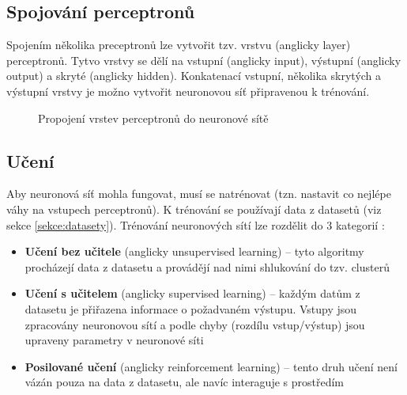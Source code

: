 \subsection*{Spojování perceptronů}
Spojením několika preceptronů lze vytvořit tzv. vrstvu (anglicky layer) perceptronů. Tytvo vrstvy se dělí na vstupní (anglicky input), výstupní (anglicky output) a skryté (anglicky hidden). Konkatenací vstupní, několika skrytých a výstupní vrstvy je možno vytvořit neuronovou síť připravenou k trénování.

\begin{figure}[H]
  \begin{center}
  \label{obrazek:nsexample}
  \caption{Propojení vrstev perceptronů do neuronové sítě}
  \end{center}
\end{figure}

\subsection*{Učení}
Aby neuronová síť mohla fungovat, musí se natrénovat (tzn. nastavit co nejlépe váhy na vstupech perceptronů). K trénování se používají data z datasetů (viz sekce \ref{sekce:datasety}). Trénování neuronových sítí lze rozdělit do 3 kategorií \cite{deeplearningbook}:

\begin{itemize}
  \item \textbf{Učení bez učitele} (anglicky unsupervised learning) -- tyto algoritmy procházejí data z datasetu a provádějí nad nimi shlukování do tzv. clusterů
  \item \textbf{Učení s učitelem} (anglicky supervised learning) -- každým datům z datasetu je přiřazena informace o požadvaném výstupu. Vstupy jsou zpracovány neuronovou sítí a podle chyby (rozdílu vstup/výstup) jsou upraveny parametry v neuronové síti
  \item \textbf{Posilované učení} (anglicky reinforcement learning) -- tento druh učení není vázán pouza na data z datasetu, ale navíc interaguje s prostředím
\end{itemize}

